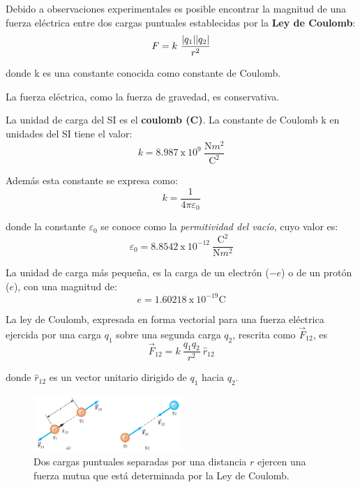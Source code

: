     \PN Debido a observaciones experimentales es posible encontrar la magnitud de una fuerza eléctrica entre dos cargas
    puntuales establecidas por la \textbf{Ley de Coulomb}:
    \begin{equation*}
      F = k \ \frac{\lvert q_{1}\rvert \lvert q_{2}\rvert}{r^{2}}
    \end{equation*}

    \PN donde k es una constante conocida como constante de Coulomb.

    \PN La fuerza eléctrica, como la fuerza de gravedad, es conservativa.

    \PN La unidad de carga del SI es el \textbf{coulomb (C)}. La constante de Coulomb k en unidades del SI tiene el
    valor:
    \begin{equation*}
      k = 8.987 \ \text{x} \ 10^{9} \ \frac{\text{N} m^{2}}{\text{C}^{2}}
    \end{equation*}

    \PN Además esta constante se expresa como:
    \begin{equation*}
      k = \frac{1}{4 \pi \varepsilon_{0}}
    \end{equation*}

    \PN donde la constante $\varepsilon_{0}$ se conoce como la \textit{permitividad del vacío}, cuyo valor es:
    \begin{equation*}
      \varepsilon_{0} = 8.8542 \ \text{x} \ 10^{-12} \ \frac{\text{C}^{2}}{\text{N} m^{2}}
    \end{equation*}

    \PN La unidad de carga más pequeña, es la carga de un electrón ($-e$) o de un protón ($e$), con una magnitud de:
    \begin{equation*}
      e = 1.60218 \ \text{x} \ 10^{-19} \text{C}
    \end{equation*}

    \PN La ley de Coulomb, expresada en forma vectorial para una fuerza eléctrica ejercida por una carga $q_{1}$ sobre
    una segunda carga $q_{2}$, rescrita como $\vec{F}_{12}$, es
    \begin{equation*}
      \vec{F}_{12} = k \ \frac{q_{1} q_{2}}{r^{2}} \ \hat{r}_{12}
    \end{equation*}

    \PN donde $\hat{r}_{12}$ es un vector unitario dirigido de $q_{1}$ hacia $q_{2}$.
    \begin{figure}[H]
    \centering
      \includegraphics[width=0.5\textwidth]{4/figure_1}
      \caption{Dos cargas puntuales separadas por una distancia $r$ ejercen una fuerza mutua que está determinada por la
      Ley de Coulomb.}
    \end{figure}


